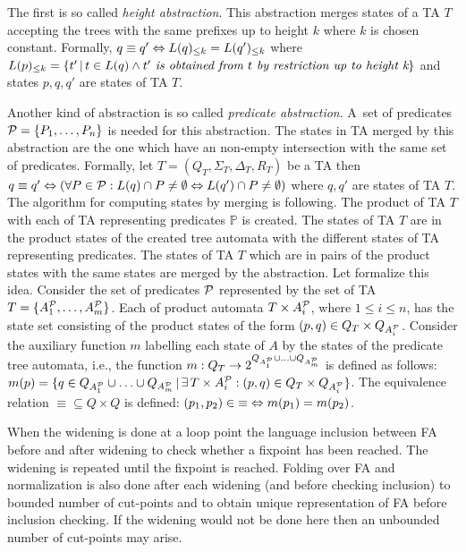 \documentclass[a4paper, 12pt]{article}
\begin{document}
The first is so called \emph{height abstraction}.
This abstraction merges states of a TA $T$ accepting the trees
with the same prefixes up to height $k$ where $k$ is chosen constant.
Formally, $q \equiv q' \defarrow L(q)_{\leq k} = L(q')_{\leq k}$
where $L(p)_{\leq k} = \{t'\,|\, t \in L(q) \wedge t' \emph{ is obtained from } t \emph{ by restriction up to height k}\}$
and states $p,q,q'$ are states of TA $T$.

Another kind of abstraction is so called \emph{predicate abstraction}.
A~set of predicates $\predset=\{\pred_1, \ldots, \pred_n\}$ is needed for this abstraction.
The states in TA merged by this abstraction are the one which have an non-empty
intersection with the same set of predicates.
Formally, let $T=(Q_T, \Sigma_T, \Delta_T, R_T)$ be a TA then $q \equiv q' \defarrow
(\forall \pred \in \predset: \langstate{T}{q} \cap \pred \neq \emptyset
\Leftrightarrow \langstate{T}{q'} \cap \pred \neq \emptyset)$
where $q,q'$ are states of TA $T$.
The algorithm for computing states by merging is following.
The product of TA $T$ with each of TA representing predicates $\mathbb{P}$ is created.
The states of TA $T$ are in the product states of the created tree automata with the different
states of TA representing predicates.
The states of TA $T$ which are in pairs of the product states with
the same states are merged by the abstraction.
Let formalize this idea.
Consider the set of predicates $\predset$ represented by the set of TA
$T=\{\predauti{1}, \ldots, \predauti{m}\}$.
Each of product automata $T \times \predauti{i}$, where $1 \leq i \leq n$, has the state set
consisting of the product states of the form $(p,q) \in Q_T \times Q_{\predauti{i}}$.
Consider the auxiliary function $m$ labelling
each state of $A$ by the states of the predicate tree automata,
i.e., the function $m: Q_T \rightarrow 2^{Q_{\predauti{1}} \cup \ldots
\cup Q_{\predauti{m}}}$ is defined as follows: $m(p) = \{q \in Q_{\predauti{1}} \cup \ldots \cup Q_{\predauti{m}}\,|\,
\exists\,T\times\predauti{i}: (p,q) \in Q_{T} \times Q_{\predauti{i}}\}$.
The equivalence relation ${\equiv} \subseteq {Q \times Q}$ is defined:
${(p_1,p_2)} \in {\equiv} \defarrow m(p_1) = m(p_2)$.

When the widening is done at a loop point the language inclusion between
FA before and after widening to check whether a fixpoint has been reached.
The widening is repeated until the fixpoint is reached.
Folding over FA and normalization is also done after each widening (and
before checking inclusion) to bounded number of cut-points
and to obtain unique representation of FA before inclusion checking.
If the widening would not be done here then an unbounded number of cut-points
may arise.
\end{document}
